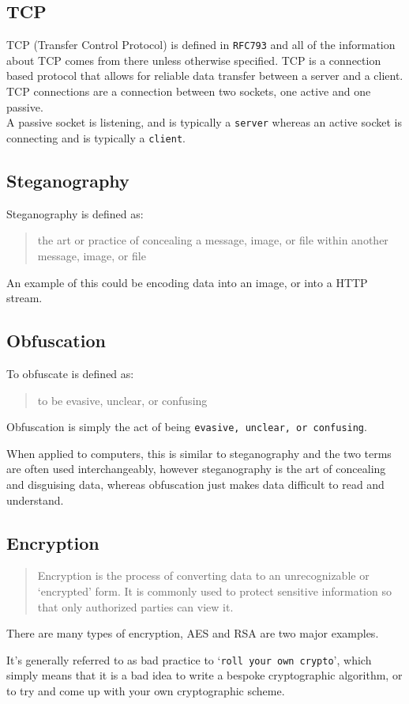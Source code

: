 \subsection{TCP}
TCP (Transfer Control Protocol) is defined in \texttt{RFC793}\cite{rfc793} and all of the information about TCP comes from there unless otherwise specified.
TCP is a connection based protocol that allows for reliable data transfer between a server and a client.\\
TCP connections are a connection between two sockets, one active and one passive.\\
A passive socket is listening, and is typically a \texttt{server} whereas an active socket is connecting and is typically a \texttt{client}.

\subsection{Steganography}
Steganography is defined as\cite{dictsteno}:
\begin{quotation}
    the art or practice of concealing a message, image, or file within
    another message, image, or file
\end{quotation}
An example of this could be encoding data into an image, or into a HTTP stream.

\subsection{Obfuscation}
To obfuscate is defined as\cite{dictobfs}:
\begin{quotation}
     to be evasive, unclear, or confusing
\end{quotation}
Obfuscation is simply the act of being \texttt{evasive, unclear, or confusing}.\par
When applied to computers, this is similar to steganography and the two terms are often used interchangeably, however steganography is the art of concealing and disguising data, whereas obfuscation just makes data difficult to read and understand. 

\subsection{Encryption}
\begin{quotation}
    Encryption is the process of converting data to an unrecognizable or
    `encrypted' form. It is commonly used to protect sensitive
    information so that only authorized parties can view it\cite{dictenc}.
\end{quotation}
There are many types of encryption, AES and RSA are two major examples.\par
It's generally referred to as bad practice to `\texttt{roll your own crypto}'\cite{memtocrypto}, which simply means that it is a bad idea to write a bespoke cryptographic algorithm, or to try and come up with your own cryptographic scheme.

